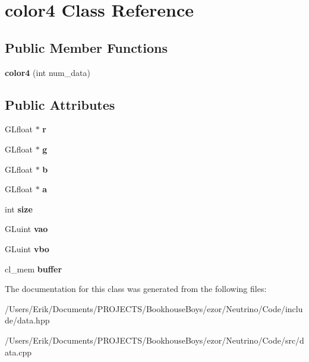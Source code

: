 \hypertarget{classcolor4}{}\section{color4 Class Reference}
\label{classcolor4}
\subsection*{Public Member Functions}
\begin{DoxyCompactItemize}
\item 
\mbox{\label{classcolor4_a255865f6e9ab69a0cc25d934f04ea0e3}} 
{\bfseries color4} (int num\+\_\+data)
\end{DoxyCompactItemize}
\subsection*{Public Attributes}
\begin{DoxyCompactItemize}
\item 
\mbox{\label{classcolor4_a403088259795ee28b91aa99ef8572133}} 
G\+Lfloat $\ast$ {\bfseries r}
\item 
\mbox{\label{classcolor4_a2a236837b876081d584f0d22b305db62}} 
G\+Lfloat $\ast$ {\bfseries g}
\item 
\mbox{\label{classcolor4_a4522da3ca89fb101844106017aa54d49}} 
G\+Lfloat $\ast$ {\bfseries b}
\item 
\mbox{\label{classcolor4_a9713048121e77c671ee3b93aff54ebc0}} 
G\+Lfloat $\ast$ {\bfseries a}
\item 
\mbox{\label{classcolor4_a6a151ec358c2332d262985b49d3f67fa}} 
int {\bfseries size}
\item 
\mbox{\label{classcolor4_a0e51035b273ca3081e8416f97c3a3d87}} 
G\+Luint {\bfseries vao}
\item 
\mbox{\label{classcolor4_a03b1149471be7d4c84eecc0c119d8724}} 
G\+Luint {\bfseries vbo}
\item 
\mbox{\label{classcolor4_a869541381331be73f48fd546225786d8}} 
cl\+\_\+mem {\bfseries buffer}
\end{DoxyCompactItemize}


The documentation for this class was generated from the following files\+:\begin{DoxyCompactItemize}
\item 
/\+Users/\+Erik/\+Documents/\+P\+R\+O\+J\+E\+C\+T\+S/\+Bookhouse\+Boys/ezor/\+Neutrino/\+Code/include/data.\+hpp\item 
/\+Users/\+Erik/\+Documents/\+P\+R\+O\+J\+E\+C\+T\+S/\+Bookhouse\+Boys/ezor/\+Neutrino/\+Code/src/data.\+cpp\end{DoxyCompactItemize}
